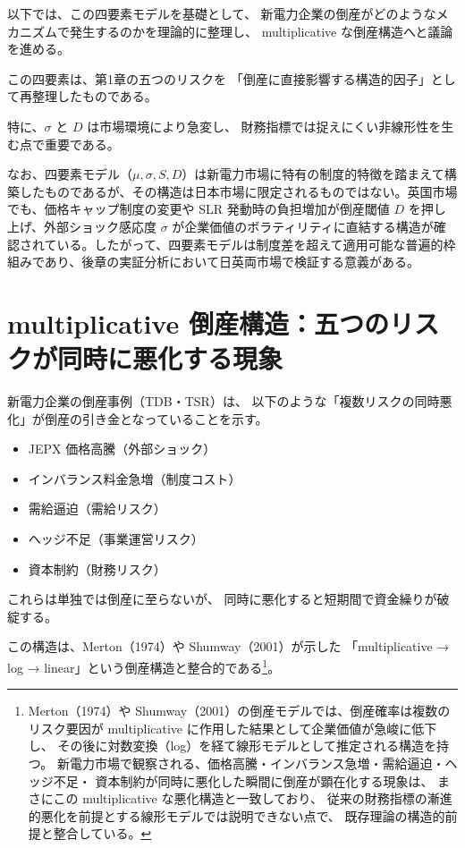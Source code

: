 以下では、この四要素モデルを基礎として、
新電力企業の倒産がどのようなメカニズムで発生するのかを理論的に整理し、
multiplicative な倒産構造へと議論を進める。


この四要素は、第1章の五つのリスクを
「倒産に直接影響する構造的因子」として再整理したものである。

特に、$\sigma$ と $D$ は市場環境により急変し、
財務指標では捉えにくい非線形性を生む点で重要である。

なお、四要素モデル（$\mu, \sigma, S, D$）は新電力市場に特有の制度的特徴を踏まえて構築したものであるが、その構造は日本市場に限定されるものではない。英国市場でも、価格キャップ制度の変更や SLR 発動時の負担増加が倒産閾値 $D$ を押し上げ、外部ショック感応度 $\sigma$ が企業価値のボラティリティに直結する構造が確認されている。したがって、四要素モデルは制度差を超えて適用可能な普遍的枠組みであり、後章の実証分析において日英両市場で検証する意義がある。


\section{multiplicative 倒産構造：五つのリスクが同時に悪化する現象}

新電力企業の倒産事例（TDB・TSR）は、
以下のような「複数リスクの同時悪化」が倒産の引き金となっていることを示す。

\begin{itemize}
    \item JEPX 価格高騰（外部ショック）
    \item インバランス料金急増（制度コスト）
    \item 需給逼迫（需給リスク）
    \item ヘッジ不足（事業運営リスク）
    \item 資本制約（財務リスク）
\end{itemize}

これらは単独では倒産に至らないが、
同時に悪化すると短期間で資金繰りが破綻する。

この構造は、Merton（1974）や Shumway（2001）が示した
「multiplicative → log → linear」という倒産構造と整合的である\footnote{
Merton（1974）や Shumway（2001）の倒産モデルでは、倒産確率は複数のリスク要因が
multiplicative に作用した結果として企業価値が急峻に低下し、
その後に対数変換（log）を経て線形モデルとして推定される構造を持つ。
新電力市場で観察される、価格高騰・インバランス急増・需給逼迫・ヘッジ不足・
資本制約が同時に悪化した瞬間に倒産が顕在化する現象は、
まさにこの multiplicative な悪化構造と一致しており、
従来の財務指標の漸進的悪化を前提とする線形モデルでは説明できない点で、
既存理論の構造的前提と整合している。}。

